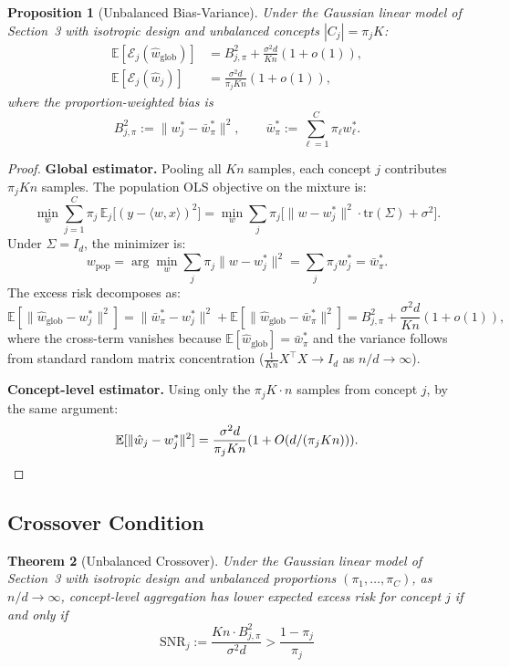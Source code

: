 \documentclass[11pt,a4paper]{article}
\newtheorem{theorem}{Theorem}
\newtheorem{proposition}[theorem]{Proposition}
\newcommand{\E}{\mathbb{E}}
\newcommand{\tr}{\mathrm{tr}}
\newcommand{\SNR}{\mathrm{SNR}}
\newcommand{\what}{\hat{w}}
\newcommand{\wbar}{\bar{w}}
\newcommand{\Id}{I_d}
\begin{document}
\begin{proposition}[Unbalanced Bias-Variance]\label{prop:unbal-bv}
Under the Gaussian linear model of Section~3 with isotropic design and unbalanced concepts $|C_j| = \pi_j K$:
\begin{align}
\E[\mathcal{E}_j(\what_{\mathrm{glob}})] &= B_{j,\pi}^2 + \frac{\sigma^2 d}{Kn}(1 + o(1)), \label{eq:unbal-global}\\
\E[\mathcal{E}_j(\what_j)] &= \frac{\sigma^2 d}{\pi_j K n}(1 + o(1)), \label{eq:unbal-concept}
\end{align}
where the \emph{proportion-weighted bias} is
\begin{equation}
B_{j,\pi}^2 := \|w_j^* - \wbar^*_\pi\|^2, \qquad \wbar^*_\pi := \sum_{\ell=1}^C \pi_\ell w_\ell^*.
\end{equation}
\end{proposition}

\begin{proof}
\textbf{Global estimator.}
Pooling all $Kn$ samples, each concept $j$ contributes $\pi_j Kn$ samples. The population OLS objective on the mixture is:
\[
\min_w \sum_{j=1}^C \pi_j \, \E_j\bigl[(y - \langle w, x\rangle)^2\bigr]
= \min_w \sum_j \pi_j \bigl[\|w - w_j^*\|^2 \cdot \tr(\Sigma) + \sigma^2\bigr].
\]
Under $\Sigma = \Id$, the minimizer is:
\[
w_{\mathrm{pop}} = \arg\min_w \sum_j \pi_j \|w - w_j^*\|^2 = \sum_j \pi_j w_j^* = \wbar^*_\pi.
\]
The excess risk decomposes as:
\[
\E[\|\what_{\mathrm{glob}} - w_j^*\|^2]
= \|\wbar^*_\pi - w_j^*\|^2 + \E[\|\what_{\mathrm{glob}} - \wbar^*_\pi\|^2]
= B_{j,\pi}^2 + \frac{\sigma^2 d}{Kn}(1 + o(1)),
\]
where the cross-term vanishes because $\E[\what_{\mathrm{glob}}] = \wbar^*_\pi$ and the variance follows from standard random matrix concentration ($\frac{1}{Kn}X^\top X \to \Id$ as $n/d \to \infty$).

\textbf{Concept-level estimator.}
Using only the $\pi_j K \cdot n$ samples from concept $j$, by the same argument:
\[
\E[\|\what_j - w_j^*\|^2] = \frac{\sigma^2 d}{\pi_j K n}(1 + O(d/(\pi_j K n))). \qedhere
\]
\end{proof}

\subsection{Crossover Condition}

\begin{theorem}[Unbalanced Crossover]\label{thm:unbal}
Under the Gaussian linear model of Section~3 with isotropic design and unbalanced proportions $(\pi_1, \ldots, \pi_C)$, as $n/d \to \infty$, concept-level aggregation has lower expected excess risk for concept $j$ if and only if
\begin{equation}\label{eq:unbal-crossover}
\boxed{\SNR_j := \frac{Kn \cdot B_{j,\pi}^2}{\sigma^2 d} > \frac{1 - \pi_j}{\pi_j}}
\end{equation}
\end{theorem}
\end{document}
